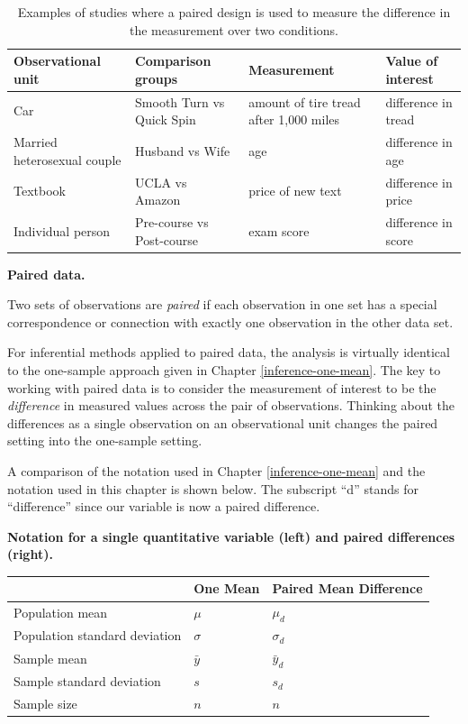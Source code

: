 \documentclass[
  10pt,
  openany]{book}
\theoremstyle{definition}
\theoremstyle{definition}
\theoremstyle{definition}
\theoremstyle{definition}
\theoremstyle{remark}
\begin{document}
\begin{table}
\centering
\caption{\label{tab:pairedexamples}Examples of studies where a paired design is used to measure the difference in the measurement over two conditions.}
\centering
\begin{tabular}[t]{l|l|l|l}
\hline
Observational unit & Comparison groups & Measurement & Value of interest\\
\hline
Car & Smooth Turn vs Quick Spin & amount of tire tread after 1,000 miles & difference in tread\\
\hline
Married heterosexual couple & Husband vs Wife & age & difference in age\\
\hline
Textbook & UCLA vs Amazon & price of new text & difference in price\\
\hline
Individual person & Pre-course vs Post-course & exam score & difference in score\\
\hline
\end{tabular}
\end{table}

\textbf{Paired data.}

Two sets of observations are \emph{paired} if each
observation in one set has a special correspondence
or connection with exactly one observation in the other
data set.

For inferential methods applied to paired data, the analysis is virtually identical to the one-sample approach given in Chapter \ref{inference-one-mean}.
The key to working with paired data is to consider the measurement of interest to be the \emph{difference} in measured values across the pair of observations.
Thinking about the differences as a single observation on an observational unit changes the paired setting into the one-sample setting.

A comparison of the notation used in Chapter \ref{inference-one-mean} and the notation used in this chapter is shown below. The subscript ``d'' stands for ``difference'' since our variable is now a paired difference.

\textbf{Notation for a single quantitative variable (left) and paired differences (right).}

{\def\LTcaptype{none} %
\begin{longtable}[]{@{}lll@{}}
\toprule\noalign{}
& \textbf{One Mean} & \textbf{Paired Mean Difference} \\
\midrule\noalign{}
\endhead
\bottomrule\noalign{}
\endlastfoot
Population mean & \(\mu\) & \(\mu_d\) \\
Population standard deviation & \(\sigma\) & \(\sigma_d\) \\
Sample mean & \(\bar{y}\) & \(\bar{y}_d\) \\
Sample standard deviation & \(s\) & \(s_d\) \\
Sample size & \(n\) & \(n\) \\
\end{longtable}
}
\end{document}
